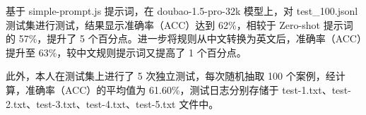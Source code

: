 \documentclass[10.5pt,compsoc]{CjC}
\theoremstyle{mystyle}
\begin{document}
\begin{CJK*}{UTF8}{zhhei}
基于 simple-prompt.js 提示词，在 doubao-1.5-pro-32k 模型上，对 test\_100.jsonl 测试集进行测试，结果显示准确率（ACC）达到 62\%，相较于 Zero-shot 提示词的 57\%，提升了 5 个百分点。进一步将规则从中文转换为英文后，准确率（ACC）提升至 63\%，较中文规则提示词又提高了 1 个百分点。



此外，本人在测试集上进行了 5 次独立测试，每次随机抽取 100 个案例，经计算，准确率（ACC）的平均值为 61.60\%，测试日志分别存储于 test-1.txt、test-2.txt、test-3.txt、test-4.txt、test-5.txt 文件中。


\end{CJK*}
\end{document}
